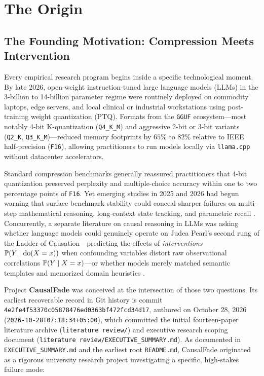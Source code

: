\chapter{The Origin}\label{ch:origin}

\section{The Founding Motivation: Compression Meets Intervention}

Every empirical research program begins inside a specific technological moment. By late 2026, open-weight instruction-tuned large language models (LLMs) in the 3-billion to 14-billion parameter regime were routinely deployed on commodity laptops, edge servers, and local clinical or industrial workstations using post-training weight quantization (PTQ). Formats from the \texttt{GGUF} ecosystem---most notably 4-bit K-quantization (\texttt{Q4\_K\_M}) and aggressive 2-bit or 3-bit variants (\texttt{Q2\_K}, \texttt{Q3\_K\_M})---reduced memory footprints by $65\%$ to $82\%$ relative to IEEE half-precision (\texttt{F16}), allowing practitioners to run models locally via \texttt{llama.cpp} without datacenter accelerators.

Standard compression benchmarks generally reassured practitioners that 4-bit quantization preserved perplexity and multiple-choice accuracy within one to two percentage points of \texttt{F16}. Yet emerging studies in 2025 and 2026 had begun warning that surface benchmark stability could conceal sharper failures on multi-step mathematical reasoning, long-context state tracking, and parametric recall \citep{liu2025hurts,li2025meets,zhang2025compression,lian2026inflates,alimaskina2026extreme}. Concurrently, a separate literature on causal reasoning in LLMs was asking whether language models could genuinely operate on Judea Pearl's second rung of the Ladder of Causation---predicting the effects of \emph{interventions} $\mathbb{P}(Y \mid \operatorname{do}(X=x))$ when confounding variables distort raw observational correlations $\mathbb{P}(Y \mid X=x)$---or whether models merely matched semantic templates and memorized domain heuristics \citep{jin2023cladder,kiciman2023causal,yu2025causaleval,wang2026causalflip}.

Project \textbf{CausalFade} was conceived at the intersection of those two questions. Its earliest recoverable record in Git history is commit \nolinkurl{4e2fe4f53370c05878476ed0363bf472fcd34d17}, authored on October 28, 2026 (\texttt{2026-10-28T07:18:34+05:00}), which committed the initial fourteen-paper literature archive (\texttt{literature review/}) and executive research scoping document (\texttt{literature review/EXECUTIVE\_SUMMARY.md}). As documented in \texttt{EXECUTIVE\_SUMMARY.md} and the earliest root \texttt{README.md}, CausalFade originated as a rigorous university research project investigating a specific, high-stakes failure mode:

